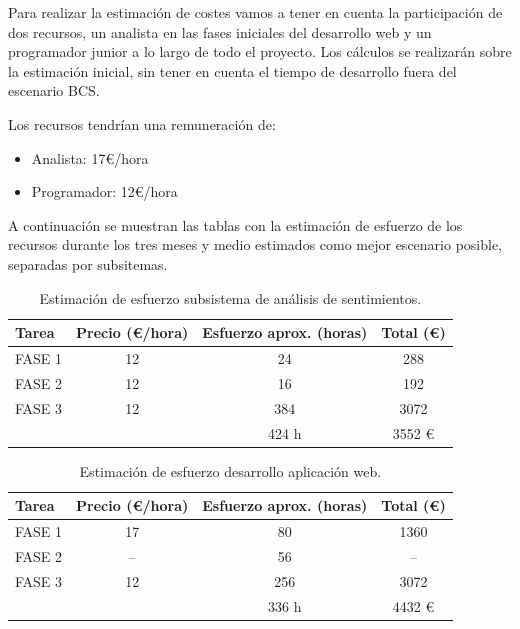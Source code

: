 Para realizar la estimación de costes vamos a tener en cuenta la participación de dos recursos, un analista en las fases iniciales del desarrollo web y un programador junior a lo largo de todo el proyecto. Los cálculos se realizarán sobre la estimación inicial, sin tener en cuenta el tiempo de desarrollo fuera del escenario BCS.

Los recursos tendrían una remuneración de:

\begin{itemize}
	\item Analista: 17€/hora
	\item Programador: 12€/hora
\end{itemize}

A continuación se muestran las tablas con la estimación de esfuerzo de los recursos durante los tres meses y medio estimados como mejor escenario posible, separadas por subsitemas.

\begin{table}[H]
	\centering
\begin{tabular}{|l|c|c|c|}
	\hline
	Tarea  & Precio (€/hora) & Esfuerzo aprox. (horas) & Total (€) \\ \hline
	FASE 1 & 12              & 24                      & 288       \\ \hline
	FASE 2 & 12              & 16                      & 192       \\ \hline
	FASE 3 & 12              & 384                      & 3072       \\ \hline
	&                 & 424 h                    & 3552 €    \\ \hline
\end{tabular}
\caption{Estimación de esfuerzo subsistema de análisis de sentimientos.}
\label{esf-anal-sent}
\end{table}

\begin{table}[H]
	\centering
	\begin{tabular}{|l|c|c|c|}
		\hline
		Tarea  & Precio (€/hora) & Esfuerzo aprox. (horas) & Total (€) \\ \hline
		FASE 1 & 17              & 80                      & 1360      \\ \hline
		FASE 2 & --              & 56                      & --        \\ \hline
		FASE 3 & 12              & 256                     & 3072      \\ \hline
		&                 & 336 h                   & 4432 €    \\ \hline
	\end{tabular}
\caption{Estimación de esfuerzo desarrollo aplicación web.}
\label{esf-web}
\end{table}

